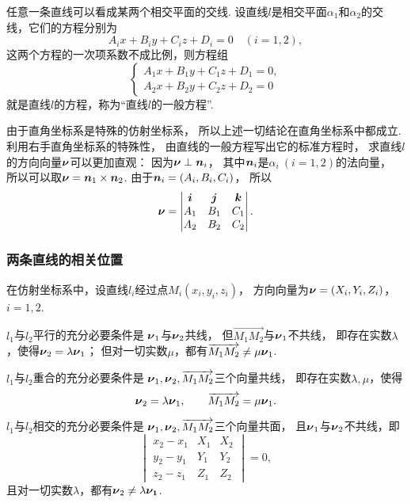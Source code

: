 任意一条直线可以看成某两个相交平面的交线.
设直线\(l\)是相交平面\(\alpha_1\)和\(\alpha_2\)的交线，它们的方程分别为\[
	A_i x + B_i y + C_i z + D_i = 0
	\quad(i=1,2),
\]
这两个方程的一次项系数不成比例，则方程组
\begin{equation}
	\left\{ \begin{array}{l}
		A_1 x + B_1 y + C_1 z + D_1 = 0, \\
		A_2 x + B_2 y + C_2 z + D_2 = 0
	\end{array} \right.
\end{equation}
就是直线\(l\)的方程，称为“直线\(l\)的一般方程”.

由于直角坐标系是特殊的仿射坐标系，
所以上述一切结论在直角坐标系中都成立.
利用右手直角坐标系的特殊性，
由直线的一般方程写出它的标准方程时，
求直线\(l\)的方向向量\(\boldsymbol{\nu}\)可以更加直观：
因为\(\boldsymbol{\nu}\perp\boldsymbol{n}_i\)，
其中\(\boldsymbol{n}_i\)是\(\alpha_i\ (i=1,2)\)的法向量，
所以可以取\(\boldsymbol{\nu}=\boldsymbol{n}_1\times\boldsymbol{n}_2\).
由于\(\boldsymbol{n}_i = (A_i,B_i,C_i)\)，
所以\[
	\boldsymbol{\nu}
	= \begin{vmatrix}
		\boldsymbol{i} & \boldsymbol{j} & \boldsymbol{k} \\
		A_1 & B_1 & C_1 \\
		A_2 & B_2 & C_2
	\end{vmatrix}.
\]

\subsubsection{两条直线的相关位置}
在仿射坐标系中，设直线\(l_i\)经过点\(M_i(x_i,y_i,z_i)\)，
方向向量为\(\boldsymbol{\nu}=(X_i,Y_i,Z_i)\)，\(i=1,2\).

\(l_1\)与\(l_2\)平行的充分必要条件是
\(\boldsymbol{\nu}_1\)与\(\boldsymbol{\nu}_2\)共线，
但\(\vec{M_1 M_2}\)与\(\boldsymbol{\nu}_1\)不共线，
即存在实数\(\lambda\)，使得\(\boldsymbol{\nu}_2 = \lambda \boldsymbol{\nu}_1\)；
但对一切实数\(\mu\)，都有\(\overrightarrow{M_1 M_2} \neq \mu \boldsymbol{\nu}_1\).

\(l_1\)与\(l_2\)重合的充分必要条件是
\(\boldsymbol{\nu}_1,\boldsymbol{\nu}_2,\overrightarrow{M_1 M_2}\)三个向量共线，
即存在实数\(\lambda,\mu\)，使得\[
	\boldsymbol{\nu}_2 = \lambda \boldsymbol{\nu}_1,
	\qquad
	\overrightarrow{M_1 M_2} = \mu \boldsymbol{\nu}_1.
\]

\(l_1\)与\(l_2\)相交的充分必要条件是
\(\boldsymbol{\nu}_1,\boldsymbol{\nu}_2,\overrightarrow{M_1 M_2}\)三个向量共面，
且\(\boldsymbol{\nu}_1\)与\(\boldsymbol{\nu}_2\)不共线，即\[
	\begin{vmatrix}
		x_2 - x_1 & X_1 & X_2 \\
		y_2 - y_1 & Y_1 & Y_2 \\
		z_2 - z_1 & Z_1 & Z_2
	\end{vmatrix} = 0,
\]
且对一切实数\(\lambda\)，都有\(\boldsymbol{\nu}_2 \neq \lambda \boldsymbol{\nu_1}\).

